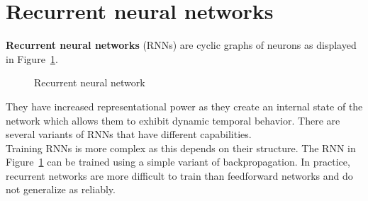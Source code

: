 \documentclass{report}
\begin{document}
\section{Recurrent neural networks}
{\bf Recurrent neural networks} (RNNs) are cyclic graphs of neurons as displayed in Figure~\ref{figure:recurrentneuralnetwork}.

\begin{figure}[h!]
\centering
{}
\caption{Recurrent neural network}
\label{figure:recurrentneuralnetwork}
\end{figure}

They have increased representational power as they create an internal state of the network which allows them to exhibit dynamic temporal behavior. There are several variants of RNNs that have different capabilities.
\\
Training RNNs is more complex as this depends on their structure. The RNN in Figure~\ref{figure:recurrentneuralnetwork} can be trained using a simple variant of backpropagation.
In practice, recurrent networks are more difficult to train than feedforward networks and do not generalize as reliably.
\end{document}
